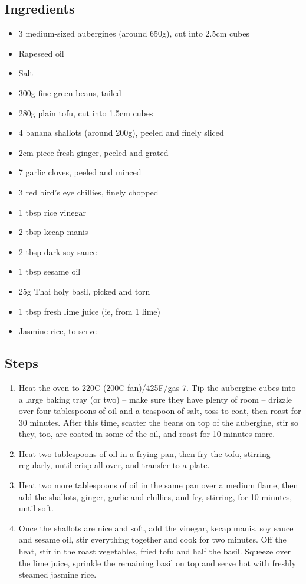 \documentclass{book}
\begin{document}
\subsection*{Ingredients}
\begin{itemize}
\item 3 medium-sized aubergines (around 650g), cut into 2.5cm cubes
\item Rapeseed oil
\item Salt
\item 300g fine green beans, tailed
\item 280g plain tofu, cut into 1.5cm cubes
\item 4 banana shallots (around 200g), peeled and finely sliced
\item 2cm piece fresh ginger, peeled and grated
\item 7 garlic cloves, peeled and minced
\item 3 red bird’s eye chillies, finely chopped
\item 1 tbsp rice vinegar
\item 2 tbsp kecap manis
\item 2 tbsp dark soy sauce
\item 1 tbsp sesame oil
\item 25g Thai holy basil, picked and torn
\item 1 tbsp fresh lime juice (ie, from 1 lime)
\item Jasmine rice, to serve
\end{itemize}

\subsection*{Steps}
\begin{enumerate}
\item Heat the oven to 220C (200C fan)/425F/gas 7. Tip the aubergine cubes into a large baking tray (or two) – make sure they have plenty of room – drizzle over four tablespoons of oil and a teaspoon of salt, toss to coat, then roast for 30 minutes. After this time, scatter the beans on top of the aubergine, stir so they, too, are coated in some of the oil, and roast for 10 minutes more.
\item Heat two tablespoons of oil in a frying pan, then fry the tofu, stirring regularly, until crisp all over, and transfer to a plate. 
\item Heat two more tablespoons of oil in the same pan over a medium flame, then add the shallots, ginger, garlic and chillies, and fry, stirring, for 10 minutes, until soft.
\item Once the shallots are nice and soft, add the vinegar, kecap manis, soy sauce and sesame oil, stir everything together and cook for two minutes. Off the heat, stir in the roast vegetables, fried tofu and half the basil. Squeeze over the lime juice, sprinkle the remaining basil on top and serve hot with freshly steamed jasmine rice.
\end{enumerate}
\newpage
\end{document}
